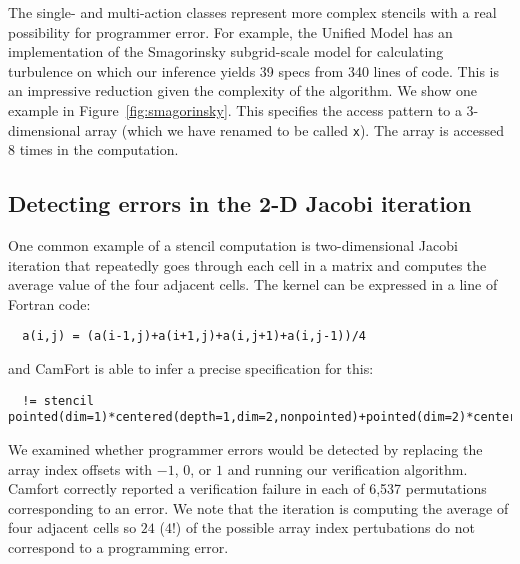 \documentclass[10pt,preprint]{sigplanconf}
\theoremstyle{definition}
\begin{document}
The single- and multi-action classes represent more complex stencils
with a real possibility for programmer error. For example, the Unified
Model has an implementation of the Smagorinsky subgrid-scale model for
calculating turbulence on which our inference yields 39 specs from 340
lines of code. This is an impressive reduction given
the complexity of the algorithm.  We show one example in
Figure~\cref{fig:smagorinsky}. This specifies the access pattern to
a 3-dimensional array (which we have renamed to be called
\texttt{x}). The array is accessed 8 times in the computation.

\subsection{Detecting errors in the 2-D Jacobi iteration}

One common example of a stencil computation is two-dimensional
Jacobi iteration that repeatedly goes through each cell in a matrix
and computes the average value of the four adjacent cells. The kernel
can be expressed in a line of Fortran code:
\begin{verbatim}
  a(i,j) = (a(i-1,j)+a(i+1,j)+a(i,j+1)+a(i,j-1))/4
\end{verbatim}
and CamFort is able to infer a precise specification for this:
\begin{verbatim}
  != stencil pointed(dim=1)*centered(depth=1,dim=2,nonpointed)+pointed(dim=2)*centered(depth=1,dim=1,nonpointed)::a
\end{verbatim}

We examined whether programmer errors would be detected by replacing
the array index offsets with $-1$, $0$, or $1$ and running our
verification algorithm. Camfort correctly reported a verification
failure in each of 6,537 permutations corresponding to an error.  We
note that the iteration is computing the average of four adjacent
cells so $24$ ($4!$) of the possible array index pertubations do not
correspond to a programming error.




\end{document}
